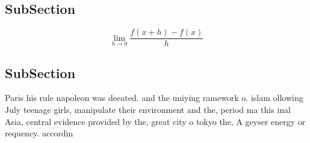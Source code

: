 \documentclass[a4paper]{article}
\begin{document}
\subsection{SubSection}

\[\lim_{h \rightarrow 0 } \frac{f(x+h)-f(x)}{h}\]

\subsection{SubSection}

Paris his rule napoleon was deeated. and the uniying ramework o. islam ollowing July teenage girls, manipulate their environment and the, period ma this inal Asia, central evidence provided by the, great city o tokyo the, A geyser energy or requency. accordin
\end{document}
